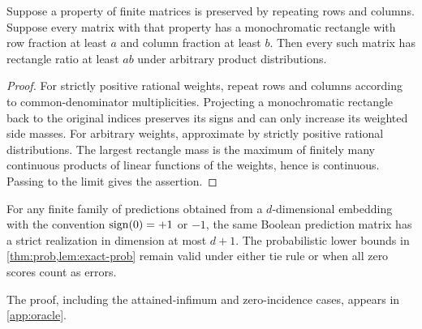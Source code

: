 \begin{lemma}\label{lem:product-weights}
Suppose a property of finite matrices is preserved by repeating rows and columns. Suppose every matrix with that property has a monochromatic rectangle with row fraction at least $a$ and column fraction at least $b$. Then every such matrix has rectangle ratio at least $ab$ under arbitrary product distributions.
\end{lemma}
\begin{proof}
For strictly positive rational weights, repeat rows and columns according to common-denominator multiplicities. Projecting a monochromatic rectangle back to the original indices preserves its signs and can only increase its weighted side masses. For arbitrary weights, approximate by strictly positive rational distributions. The largest rectangle mass is the maximum of finitely many continuous products of linear functions of the weights, hence is continuous. Passing to the limit gives the assertion.
\end{proof}

\begin{lemma}\label{lem:ties}
For any finite family of predictions obtained from a $d$-dimensional embedding with the convention $\operatorname{sign}(0)=+1$ or $-1$, the same Boolean prediction matrix has a strict realization in dimension at most $d+1$. The probabilistic lower bounds in \cref{thm:prob,lem:exact-prob} remain valid under either tie rule or when all zero scores count as errors.
\end{lemma}
\noindent The proof, including the attained-infimum and zero-incidence cases, appears in \cref{app:oracle}.
